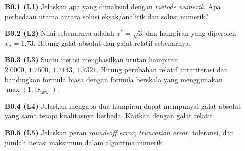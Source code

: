 \begin{enumerate}
\item[\textbf{B0.1 (L1)}] Jelaskan apa yang dimaksud dengan \textit{metode numerik}. Apa perbedaan utama antara solusi eksak/analitik dan solusi numerik?
\item[\textbf{B0.2 (L2)}] Nilai sebenarnya adalah \(x^\ast=\sqrt{3}\) dan hampiran yang diperoleh \(x_a=1.73\). Hitung galat absolut dan galat relatif sebenarnya.
\item[\textbf{B0.3 (L3)}] Suatu iterasi menghasilkan urutan hampiran \(2.0000,\ 1.7500,\ 1.7143,\ 1.7321\). Hitung perubahan relatif antariterasi dan bandingkan formula biasa dengan formula berskala yang menggunakan \(\max(1,|x_{\mathrm{new}}|)\).
\item[\textbf{B0.4 (L4)}] Jelaskan mengapa dua hampiran dapat mempunyai galat absolut yang sama tetapi kualitasnya berbeda. Kaitkan dengan galat relatif.
\item[\textbf{B0.5 (L5)}] Jelaskan peran \textit{round-off error}, \textit{truncation error}, toleransi, dan jumlah iterasi maksimum dalam algoritma numerik.
\end{enumerate}
